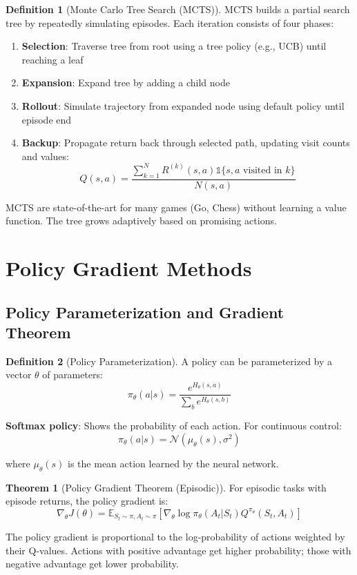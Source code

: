 \documentclass[12pt,a4paper]{article}
\theoremstyle{definition}
\newtheorem{definition}{Definition}[section]
\newtheorem{theorem}{Theorem}[section]
\begin{document}
\begin{definition}[Monte Carlo Tree Search (MCTS)]
MCTS builds a partial search tree by repeatedly simulating episodes. Each iteration consists of four phases:

\begin{enumerate}
    \item \textbf{Selection}: Traverse tree from root using a tree policy (e.g., UCB) until reaching a leaf
    \item \textbf{Expansion}: Expand tree by adding a child node
    \item \textbf{Rollout}: Simulate trajectory from expanded node using default policy until episode end
    \item \textbf{Backup}: Propagate return back through selected path, updating visit counts and values:
    \[
    Q(s, a) = \frac{\sum_{k=1}^{N} R^{(k)}(s, a) \mathbb{1}\{s, a \text{ visited in } k\}}{N(s, a)}
    \]
\end{enumerate}

MCTS are state-of-the-art for many games (Go, Chess) without learning a value function. The tree grows adaptively based on promising actions.
\end{definition}

\section{Policy Gradient Methods}

\subsection{Policy Parameterization and Gradient Theorem}

\begin{definition}[Policy Parameterization]
A policy can be parameterized by a vector $\theta$ of parameters:
\[
\pi_\theta(a|s) = \frac{e^{H_\theta(s, a)}}{\sum_b e^{H_\theta(s, b)}}
\]

\textbf{Softmax policy}: Shows the probability of each action. For continuous control:
\[
\pi_\theta(a|s) = \mathcal{N}(\mu_\theta(s), \sigma^2)
\]

where $\mu_\theta(s)$ is the mean action learned by the neural network.
\end{definition}

\begin{theorem}[Policy Gradient Theorem (Episodic)]
For episodic tasks with episode returns, the policy gradient is:
\[
\nabla_\theta J(\theta) = \mathbb{E}_{S_t \sim \pi, A_t \sim \pi} \left[ \nabla_\theta \log \pi_\theta(A_t|S_t) Q^{\pi_\theta}(S_t, A_t) \right]
\]

The policy gradient is proportional to the log-probability of actions weighted by their Q-values. Actions with positive advantage get higher probability; those with negative advantage get lower probability.
\end{theorem}
\end{document}
